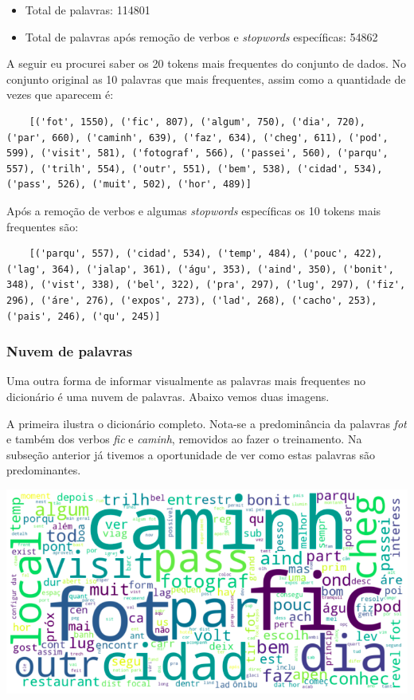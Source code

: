 \begin{itemize}
    \item Total de palavras: 114801
    \item Total de palavras após remoção de verbos e \textit{stopwords} específicas: 54862
\end{itemize}

A seguir eu procurei saber os 20 tokens mais frequentes do conjunto de dados. No conjunto original as 10 palavras que mais frequentes, 
assim como a quantidade de vezes que aparecem é:

\begin{lstlisting}
    [('fot', 1550), ('fic', 807), ('algum', 750), ('dia', 720), ('par', 660), ('caminh', 639), ('faz', 634), ('cheg', 611), ('pod', 599), ('visit', 581), ('fotograf', 566), ('passei', 560), ('parqu', 557), ('trilh', 554), ('outr', 551), ('bem', 538), ('cidad', 534), ('pass', 526), ('muit', 502), ('hor', 489)]
\end{lstlisting}

Após a remoção de verbos e algumas \textit{stopwords} específicas os 10 tokens mais frequentes são:

\begin{lstlisting}
    [('parqu', 557), ('cidad', 534), ('temp', 484), ('pouc', 422), ('lag', 364), ('jalap', 361), ('águ', 353), ('aind', 350), ('bonit', 348), ('vist', 338), ('bel', 322), ('pra', 297), ('lug', 297), ('fiz', 296), ('áre', 276), ('expos', 273), ('lad', 268), ('cacho', 253), ('pais', 246), ('qu', 245)]
\end{lstlisting}

\subsubsection{Nuvem de palavras}

Uma outra forma de informar visualmente as palavras mais frequentes no dicionário é uma nuvem de palavras. Abaixo vemos duas imagens.

A primeira ilustra o dicionário completo. Nota-se a predominância da palavras \textit{fot} e também dos verbos \textit{fic} e \textit{caminh}, removidos
ao fazer o treinamento. Na subseção anterior já tivemos a oportunidade de ver como estas palavras são predominantes.

\vspace{3mm} %

\includegraphics[scale=0.5]{explore/resources/nuvem_palavras_completo.png}

